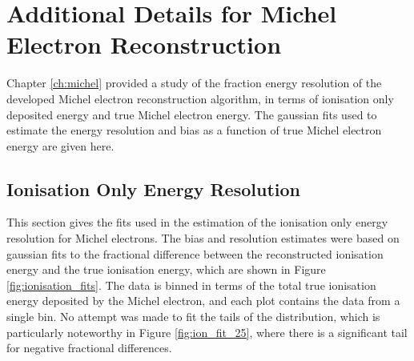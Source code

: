 \chapter{Additional Details for Michel Electron Reconstruction}\label{ch:energyfits}

\minitoc

Chapter \ref{ch:michel} provided a study of the fraction energy resolution of
the developed Michel electron reconstruction algorithm, in terms of ionisation
only deposited energy and true Michel electron energy. The gaussian fits used to
estimate the energy resolution and bias as a function of true Michel electron 
energy are given here.

\section{Ionisation Only Energy Resolution}
This section gives the fits used in the estimation of the ionisation only energy
resolution for Michel electrons. The bias and resolution estimates were based on
gaussian fits to the fractional difference between the reconstructed ionisation
energy and the true ionisation energy, which are shown in Figure 
\ref{fig:ionisation_fits}. The data is binned in terms of the total true 
ionisation energy deposited by the Michel electron, and each plot contains the 
data from a single bin. No attempt was made to fit the tails of the 
distribution, which is particularly noteworthy in Figure \ref{fig:ion_fit_25}, 
where there is a significant tail for negative fractional differences. 

